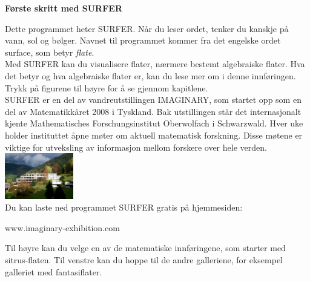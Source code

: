 \documentclass[sans]{amsart}
\newlength{\galIntroHeight}
\newlength{\galIntroWidth}
\newenvironment{surferGalIntroPage}{%
  \newpage
  \special{papersize=\galIntroHeight,\galIntroWidth}
  \pagecolor{textHgColor}
  \color{textFgColor}
  \thispagestyle{empty}
  \begin{flushleft}}%
  {\end{flushleft}}
\newenvironment{galTitle}{\bf}{

}
\newenvironment{surferText}{}{}
\begin{document}
\footnotesize
\begin{surferGalIntroPage}
  \begin{galTitle}Første skritt med SURFER\end{galTitle}
  \begin{surferText}
 Dette programmet heter SURFER. Når du leser ordet, tenker du kanskje på vann, sol og bølger. 
 Navnet til programmet kommer fra det engelske ordet surface, som betyr {\it flate}. 
\\
Med SURFER kan du visualisere flater, nærmere bestemt algebraiske flater. Hva det betyr og 
hva algebraiske flater er, kan du lese mer om i denne innføringen. Trykk på figurene til 
høyre for å se gjennom kapitlene.\\

SURFER er en del av vandreutstillingen IMAGINARY, som startet opp som en del av Matematikkåret
 2008 i Tyskland. Bak utstillingen står det internasjonalt kjente Mathematisches Forschungsinstitut 
 Oberwolfach i Schwarzwald. Hver uke holder instituttet åpne møter om aktuell matematisk forskning.
 Disse møtene er viktige for utveksling av informasjon mellom forskere over hele verden.\\
 
\vspace{0.2cm} \hspace{3.5cm}\includegraphics[width=3cm]{./../../common/images/photo_mfo.jpg}\\
Du kan laste ned programmet SURFER gratis på hjemmesiden: \\
\begin{centering}
www.imaginary-exhibition.com\\
\end{centering}
 \vspace{0.2cm}
Til høyre kan du velge en av de matematiske innføringene, som starter med sitrus-flaten.
 Til venstre kan du hoppe til de andre galleriene, for eksempel galleriet med fantasiflater.
   
     \end{surferText}
\end{surferGalIntroPage}
\end{document}
